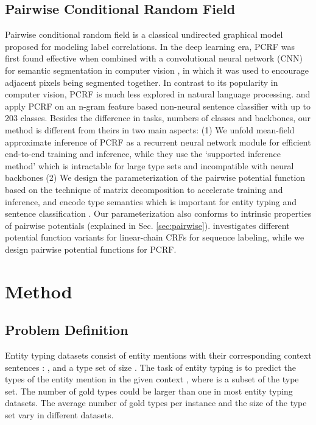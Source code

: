 \documentclass[11pt]{article}
\begin{document}
\subsection{Pairwise Conditional Random Field}
Pairwise conditional random field \cite{pcrf2005} is a classical undirected graphical model proposed for modeling label correlations. In the deep learning era, PCRF was first found effective when combined with a convolutional neural network (CNN) \cite{cnn} for semantic segmentation in computer vision \cite{crfrnn,pcrf1,pcrf2,pcrf3,fw2021}, in which it was used to encourage adjacent pixels being segmented together. In contrast to its popularity in computer vision, PCRF is much less explored in natural language processing.
\citet{pcrf2005} and \citet{pcrfT} apply PCRF on an n-gram feature based non-neural sentence classifier with up to 203 classes. Besides the difference in tasks, numbers of classes and backbones, our method is different from theirs in two main aspects: (1) We unfold mean-field approximate inference of PCRF as a recurrent neural network module for efficient end-to-end training and inference, while they use the `supported inference method' \cite{pcrf2005} which is intractable for large type sets and incompatible with neural backbones (2) We design the parameterization of the pairwise potential function based on the technique of matrix decomposition to accelerate training and inference, and encode type semantics which is important for entity typing \cite{lite} and sentence classification \cite{mueller2022label}. Our parameterization also conforms to intrinsic properties of pairwise potentials (explained in Sec. \ref{sec:pairwise}). \citet{hu-etal-2020-investigation} investigates different potential function variants for linear-chain CRFs for sequence labeling, while we design pairwise potential functions for PCRF. \section{Method}
\subsection{Problem Definition} 
Entity typing datasets consist of  entity mentions  with their corresponding context sentences : , and a type set  of size . 
The task of entity typing is to predict the types  of the entity mention  in the given context , where  is a subset of the type set. The number of gold types  could be larger than one in most entity typing datasets. The average number of gold types per instance  and the size of the type set  vary in different datasets.
\end{document}
